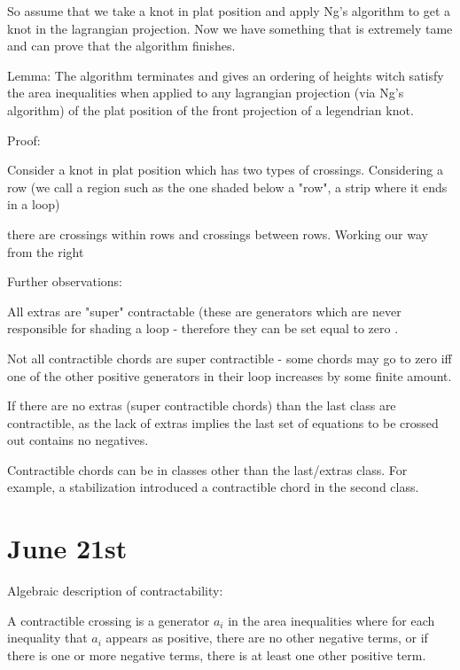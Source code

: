 \documentclass[11pt]{amsart}
\begin{document}
So assume that we take a knot in plat position and apply Ng's algorithm to get a knot in the lagrangian projection. Now we have something that is extremely tame and can prove that the algorithm finishes.



Lemma: The algorithm terminates and gives an ordering of heights witch satisfy the area inequalities when applied to any lagrangian projection (via Ng's algorithm) of the plat position of the front projection of a legendrian knot. 

Proof:

Consider a knot in plat position which has two types of crossings. Considering a row (we call a region such as the one shaded below a "row", a strip where it ends in a loop)



there are crossings within rows and crossings between rows. Working our way from the right






Further observations:

All extras are "super" contractable (these are generators which are never responsible for shading a loop - therefore they can  be set equal to zero .

Not all contractible chords are super contractible - some chords may go to zero iff one of the other positive generators in their loop increases by some finite amount. 


If there are no extras (super contractible chords) than the last class are contractible, as the lack of extras implies the last set of equations to be crossed out contains no negatives. 


Contractible chords can be in classes other than the last/extras class. For example, a stabilization introduced a contractible chord in the second class.









\section{June 21st}


Algebraic description of contractability:

A contractible crossing is a generator $a_i$ in the area inequalities where for each inequality that $a_i$ appears as positive, there are no other negative terms, or if there is one or more negative terms, there is at least one other positive term.
\end{document}
